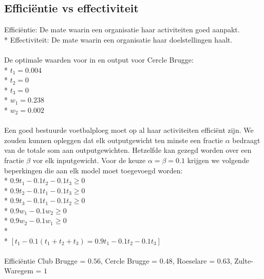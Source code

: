 \documentclass[10pt]{article}
\begin{document}
\subsection{Effici\"entie vs effectiviteit}
Effici\"entie: De mate waarin een organisatie haar activiteiten goed aanpakt.\\*
Effectiviteit: De mate waarin een organisatie haar doelstellingen haalt.\\\\
De optimale waarden voor in en output voor Cercle Brugge:\\*
$t_1 = 0.004$\\*
$t_2 = 0$\\*
$t_3 = 0$\\*
$w_1 = 0.238$\\*
$w_2 = 0.002$\\\\
Een goed bestuurde voetbalploeg moet op al haar activiteiten effici\"ent zijn. We zouden kunnen opleggen dat elk outputgewicht ten minste een fractie $\alpha$ bedraagt van de totale som aan outputgewichten. Hetzelfde kan gezegd worden over een fractie $\beta$ vor elk inputgewicht. Voor de keuze $\alpha=\beta=0.1$ krijgen we volgende beperkingen die aan elk model moet toegevoegd worden:\\*
$0.9t_1 - 0.1t_2 - 0.1t_3 \ge 0$\\*
$0.9t_2 - 0.1t_1 - 0.1t_3 \ge 0$\\*
$0.9t_3 - 0.1t_1 - 0.1t_2 \ge 0$\\*
$0.9w_1 - 0.1w_2 \ge 0$\\*
$0.9w_2 - 0.1w_1 \ge 0$\\*\\*
$\left[t_1 - 0.1(t_1 + t_2+ t_3) = 0.9t_1 - 0.1t_2 - 0.1t_3\right]$\\\\
Effici\"entie Club Brugge = $0.56$, Cercle Brugge = $0.48$, Roeselare = $0.63$, Zulte-Waregem = $1$
\end{document}
